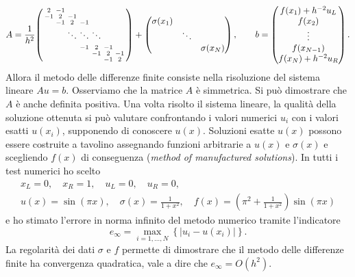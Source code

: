 \documentclass[a4paper,11pt]{article}
\newcommand{\abs}[1]{\left\lvert#1\right\rvert}
\begin{document}
\[
A = \frac{1}{h^2}
\begin{psmallmatrix}
2 & -1 &   &   &   &   &   \\ 
-1 & 2 & -1 &   &   &   &   \\ 
  & -1 & 2 & -1 &   &   &   \\ \vspace*{0.5em}
  &   & \ddots & \ddots & \ddots  &   &   \\
  &   &   & -1 & 2 & -1 &   \\ 
  &   &   &   & -1 & 2 & -1 \\ 
  &   &   &   &   & -1 & 2
\end{psmallmatrix}
+
\begin{pmatrix}
\sigma(x_1) &  &  \\ 
  & \ddots &   \\ 
  &   & \sigma(x_N)
\end{pmatrix},
\qquad
b = \begin{pmatrix}
f(x_1) + h^{-2} u_L \\ 
f(x_2) \\ 
\vdots \\ 
f(x_{N-1}) \\ 
f(x_N) + h^{-2} u_R
\end{pmatrix}.
\]
Allora il metodo delle differenze finite consiste nella
risoluzione del sistema lineare $Au = b$. Osserviamo che la matrice
$A$ è simmetrica. Si può dimostrare che $A$ è anche definita positiva.
Una volta risolto il sistema lineare, la qualità della soluzione
ottenuta si può valutare confrontando i valori numerici $u_i$ con
i valori esatti $u(x_i)$, supponendo di conoscere $u(x)$.
Soluzioni esatte $u(x)$ possono essere costruite
a tavolino assegnando funzioni arbitrarie a $u(x)$ e $\sigma(x)$
e scegliendo $f(x)$ di conseguenza (\emph{method of manufactured solutions}). In tutti i test numerici ho scelto
\begin{gather*}
x_L = 0, \quad
x_R = 1, \quad
u_L = 0, \quad
u_R = 0, \\
u(x) = \sin(\pi x), \quad
\sigma(x) = \frac{1}{1+x^2}, \quad
f(x) = \left( \pi^2 + \frac{1}{1+x^2} \right) \sin(\pi x)
\end{gather*}
e ho stimato l'errore in norma infinito del metodo numerico tramite
l'indicatore
\[
e_\infty = \max_{i=1,\dots,N} \left\{ \abs{u_i - u(x_i)} \right\}.
\]
La regolarità dei dati $\sigma$ e $f$ permette di dimostrare
che il metodo delle differenze finite ha convergenza quadratica,
vale a dire che $e_\infty = O(h^2)$.
\end{document}
